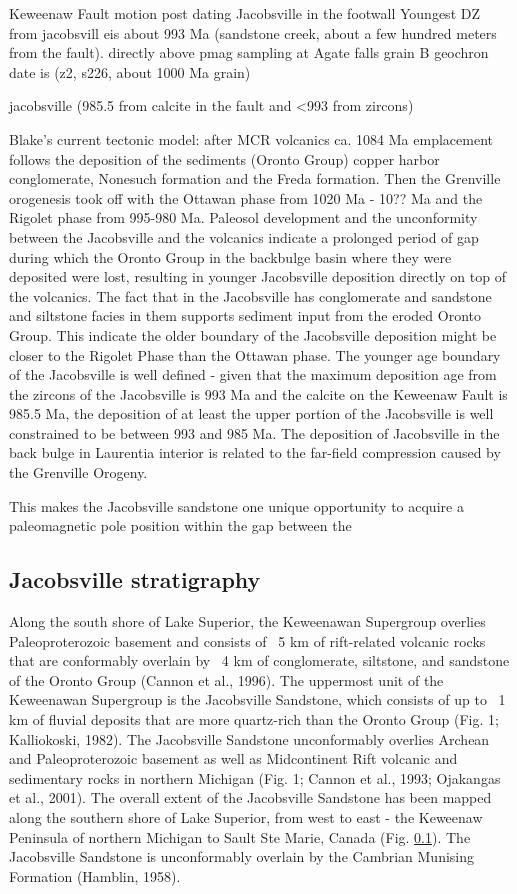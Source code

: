 \documentclass[draft]{agujournal2019}
\begin{document}
Keweenaw Fault motion post dating Jacobsville in the footwall
Youngest DZ from jacobsvill eis about 993 Ma (sandstone creek, about a few hundred meters from the fault). 
directly above pmag sampling at Agate falls grain B geochron date is (z2, s226, about 1000 Ma grain)

jacobsville (985.5 from calcite in the fault and <993 from zircons) 

Blake's current tectonic model: after MCR volcanics ca. 1084 Ma emplacement follows the deposition of the sediments (Oronto Group) copper harbor conglomerate, Nonesuch formation and the Freda formation. Then the Grenville orogenesis took off with the Ottawan phase from 1020 Ma - 10?? Ma and the Rigolet phase from 995-980 Ma. Paleosol development and the unconformity between the Jacobsville and the volcanics indicate a prolonged period of gap during which the Oronto Group in the backbulge basin where they were deposited were lost, resulting in younger Jacobsville deposition directly on top of the volcanics. The fact that in the Jacobsville has conglomerate and sandstone and siltstone facies in them supports sediment input from the eroded Oronto Group. This indicate the older boundary of the Jacobsville deposition might be closer to the Rigolet Phase than the Ottawan phase. The younger age boundary of the Jacobsville is well defined - given that the maximum deposition age from the zircons of the Jacobsville is 993 Ma and the calcite on the Keweenaw Fault is 985.5 Ma, the deposition of at least the upper portion of the Jacobsville is well constrained to be between 993 and 985 Ma. The deposition of Jacobsville in the back bulge in Laurentia interior is related to the far-field compression caused by the Grenville Orogeny. 

This makes the Jacobsville sandstone one unique opportunity to acquire a paleomagnetic pole position within the gap between the 

\subsection{Jacobsville stratigraphy}

Along the south shore of Lake Superior, the Keweenawan Supergroup overlies Paleoproterozoic basement and consists of ~5 km of rift-related volcanic rocks that are conformably overlain by ~4 km of conglomerate, siltstone, and sandstone of the Oronto Group (Cannon et al., 1996). The uppermost unit of the Keweenawan Supergroup is the Jacobsville Sandstone, which consists of up to ~1 km of fluvial deposits that are more quartz-rich than the Oronto Group (Fig. 1; Kalliokoski, 1982). The Jacobsville Sandstone unconformably overlies Archean and Paleoproterozoic basement as well as Midcontinent Rift volcanic and sedimentary rocks in northern Michigan (Fig. 1; Cannon et al., 1993; Ojakangas et al., 2001). The overall extent of the Jacobsville Sandstone has been mapped along the southern shore of Lake Superior, from west to east - the Keweenaw Peninsula of northern Michigan to Sault Ste Marie, Canada (Fig. \ref{}). The Jacobsville Sandstone is unconformably overlain by the Cambrian Munising Formation (Hamblin, 1958).
\end{document}
